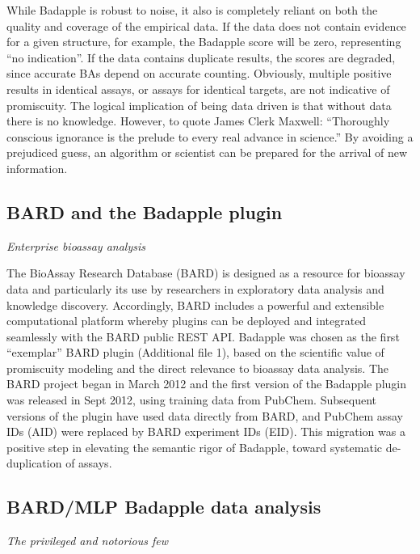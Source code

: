 While Badapple is robust to noise, it also is completely reliant on both the quality and coverage of the empirical data. If the data does not contain evidence for a given structure, for example, the Badapple score will be zero, representing “no indication”. If the data contains duplicate results, the scores are degraded, since accurate BAs depend on accurate counting. Obviously, multiple positive results in identical assays, or assays for identical targets, are not indicative of promiscuity. The logical implication of being data driven is that without data there is no knowledge. However, to quote James Clerk Maxwell: “Thoroughly conscious ignorance is the prelude to every real advance in science.” By avoiding a prejudiced guess, an algorithm or scientist can be prepared for the arrival of new information.

\subsection{BARD and the Badapple plugin}

\emph{Enterprise bioassay analysis}

The BioAssay Research Database (BARD)\cite{De_Souza2014-rf} is designed as a resource for bioassay data and particularly its use by researchers in exploratory data analysis and knowledge discovery. Accordingly, BARD includes a powerful and extensible computational platform whereby plugins can be deployed and integrated seamlessly with the BARD public REST API\cite{De_Souza2014-rf}. Badapple was chosen as the first “exemplar” BARD plugin (Additional file 1), based on the scientific value of promiscuity modeling and the direct relevance to bioassay data analysis. The BARD project began in March 2012 and the first version of the Badapple plugin was released in Sept 2012, using training data from PubChem. Subsequent versions of the plugin have used data directly from BARD, and PubChem assay IDs (AID) were replaced by BARD experiment IDs (EID). This migration was a positive step in elevating the semantic rigor of Badapple, toward systematic de-duplication of assays.

\subsection{BARD/MLP Badapple data analysis}

\emph{The privileged and notorious few}

